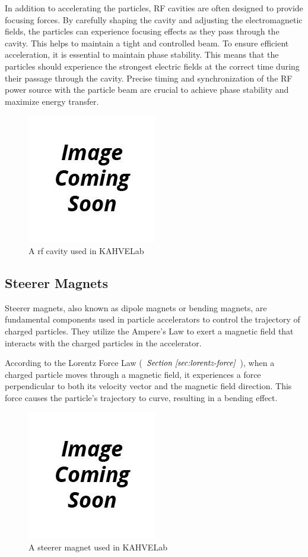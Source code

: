 \documentclass{article}
\begin{document}
In addition to accelerating the particles, RF cavities are often designed to provide focusing forces. 
By carefully shaping the cavity and adjusting the electromagnetic fields, the particles can experience focusing effects as they pass through the cavity. 
This helps to maintain a tight and controlled beam. To ensure efficient acceleration, it is essential to maintain phase stability. 
This means that the particles should experience the strongest electric fields at the correct time during their passage through the cavity. 
Precise timing and synchronization of the RF power source with the particle beam are crucial to achieve phase stability and maximize energy transfer.
\begin{figure}[H]
    \centering
    \includegraphics[scale=0.75]{../../../figures/to_be_added.png}
    \caption{A rf cavity used in KAHVELab}
\end{figure}

\subsection{Steerer Magnets}
Steerer magnets, also known as dipole magnets or bending magnets, are fundamental components used in particle accelerators to control the trajectory of charged particles. 
They utilize the Ampere's Law to exert a magnetic field that interacts with the charged particles in the accelerator. 

According to the Lorentz Force Law ( $\textit{Section \ref{sec:lorentz-force}}$ ), when a charged particle moves through a magnetic field, it experiences a force perpendicular to both its velocity 
vector and the magnetic field direction. This force causes the particle's trajectory to curve, resulting in a bending effect.

\begin{figure}[H]
    \centering
    \includegraphics[scale=0.75]{../../../figures/to_be_added.png}
    \caption{A steerer magnet used in KAHVELab}
\end{figure}
\end{document}
